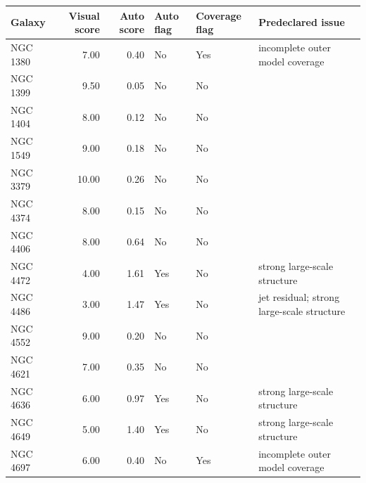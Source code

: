 \begin{tabular}{lrrlll}
\toprule
Galaxy & Visual score & Auto score & Auto flag & Coverage flag & Predeclared issue \\
\midrule
NGC 1380 & 7.00 & 0.40 & No & Yes & incomplete outer model coverage \\
NGC 1399 & 9.50 & 0.05 & No & No &  \\
NGC 1404 & 8.00 & 0.12 & No & No &  \\
NGC 1549 & 9.00 & 0.18 & No & No &  \\
NGC 3379 & 10.00 & 0.26 & No & No &  \\
NGC 4374 & 8.00 & 0.15 & No & No &  \\
NGC 4406 & 8.00 & 0.64 & No & No &  \\
NGC 4472 & 4.00 & 1.61 & Yes & No & strong large-scale structure \\
NGC 4486 & 3.00 & 1.47 & Yes & No & jet residual; strong large-scale structure \\
NGC 4552 & 9.00 & 0.20 & No & No &  \\
NGC 4621 & 7.00 & 0.35 & No & No &  \\
NGC 4636 & 6.00 & 0.97 & Yes & No & strong large-scale structure \\
NGC 4649 & 5.00 & 1.40 & Yes & No & strong large-scale structure \\
NGC 4697 & 6.00 & 0.40 & No & Yes & incomplete outer model coverage \\
\bottomrule
\end{tabular}
